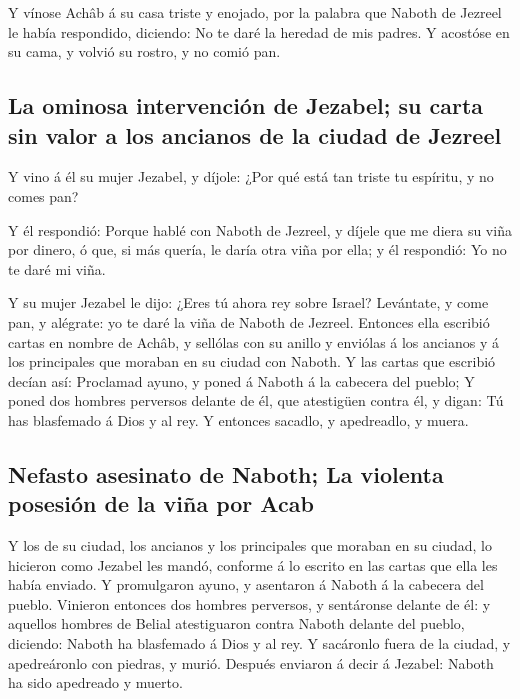  Y vínose Achâb á su casa triste y enojado, por la palabra
que Naboth de Jezreel le había respondido, diciendo: No te daré la
heredad de mis padres. Y acostóse en su cama, y volvió su rostro, y no
comió pan.

\hypertarget{la-ominosa-intervenciuxf3n-de-jezabel-su-carta-sin-valor-a-los-ancianos-de-la-ciudad-de-jezreel}{%
\subsection{La ominosa intervención de Jezabel; su carta sin valor a los
ancianos de la ciudad de
Jezreel}\label{la-ominosa-intervenciuxf3n-de-jezabel-su-carta-sin-valor-a-los-ancianos-de-la-ciudad-de-jezreel}}

 Y vino á él su mujer Jezabel, y díjole: ¿Por qué está tan
triste tu espíritu, y no comes pan?

 Y él respondió: Porque hablé con Naboth de Jezreel, y
díjele que me diera su viña por dinero, ó que, si más quería, le daría
otra viña por ella; y él respondió: Yo no te daré mi viña.

 Y su mujer Jezabel le dijo: ¿Eres tú ahora rey sobre
Israel? Levántate, y come pan, y alégrate: yo te daré la viña de Naboth
de Jezreel.  Entonces ella escribió cartas en nombre de
Achâb, y sellólas con su anillo y enviólas á los ancianos y á los
principales que moraban en su ciudad con Naboth.  Y las
cartas que escribió decían así: Proclamad ayuno, y poned á Naboth á la
cabecera del pueblo;  Y poned dos hombres perversos delante
de él, que atestigüen contra él, y digan: Tú has blasfemado á Dios y al
rey. Y entonces sacadlo, y apedreadlo, y muera.

\hypertarget{nefasto-asesinato-de-naboth-la-violenta-posesiuxf3n-de-la-viuxf1a-por-acab}{%
\subsection{Nefasto asesinato de Naboth; La violenta posesión de la viña
por
Acab}\label{nefasto-asesinato-de-naboth-la-violenta-posesiuxf3n-de-la-viuxf1a-por-acab}}

 Y los de su ciudad, los ancianos y los principales que
moraban en su ciudad, lo hicieron como Jezabel les mandó, conforme á lo
escrito en las cartas que ella les había enviado.  Y
promulgaron ayuno, y asentaron á Naboth á la cabecera del pueblo.
 Vinieron entonces dos hombres perversos, y sentáronse
delante de él: y aquellos hombres de Belial atestiguaron contra Naboth
delante del pueblo, diciendo: Naboth ha blasfemado á Dios y al rey. Y
sacáronlo fuera de la ciudad, y apedreáronlo con piedras, y murió.
 Después enviaron á decir á Jezabel: Naboth ha sido
apedreado y muerto.

